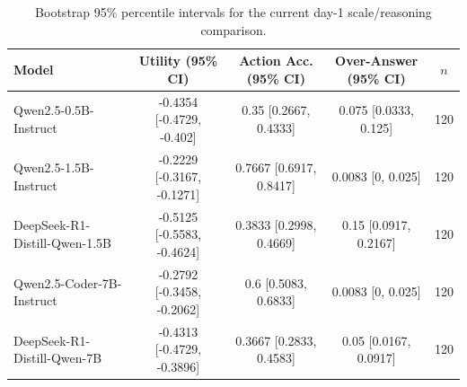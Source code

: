\begin{table}[t]
\centering
\small
\setlength{\tabcolsep}{4.0pt}
\begin{tabular}{lcccc}
\toprule
Model & Utility (95\% CI) & Action Acc. (95\% CI) & Over-Answer (95\% CI) & $n$ \\
\midrule
Qwen2.5-0.5B-Instruct & -0.4354 [-0.4729, -0.402] & 0.35 [0.2667, 0.4333] & 0.075 [0.0333, 0.125] & 120 \\
Qwen2.5-1.5B-Instruct & -0.2229 [-0.3167, -0.1271] & 0.7667 [0.6917, 0.8417] & 0.0083 [0, 0.025] & 120 \\
DeepSeek-R1-Distill-Qwen-1.5B & -0.5125 [-0.5583, -0.4624] & 0.3833 [0.2998, 0.4669] & 0.15 [0.0917, 0.2167] & 120 \\
Qwen2.5-Coder-7B-Instruct & -0.2792 [-0.3458, -0.2062] & 0.6 [0.5083, 0.6833] & 0.0083 [0, 0.025] & 120 \\
DeepSeek-R1-Distill-Qwen-7B & -0.4313 [-0.4729, -0.3896] & 0.3667 [0.2833, 0.4583] & 0.05 [0.0167, 0.0917] & 120 \\
\bottomrule
\end{tabular}
\caption{Bootstrap 95\% percentile intervals for the current day-1 scale/reasoning comparison.}
\label{tab:day1-scale-reasoning-ci-main}
\end{table}
